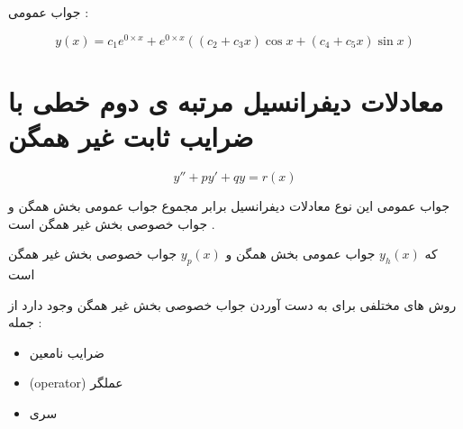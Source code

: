 \documentclass[12pt]{book}
\begin{document}
جواب عمومی :

$$
y(x) = c_{1}e^{0 \times x} + e^{0 \times x} ( (c_{2} + c_{3}x) \cos{x} + (c_{4} + c_{5}x) \sin{x} )
$$



\section{معادلات دیفرانسیل مرتبه ی دوم خطی با ضرایب ثابت غیر همگن}


$$
y'' + py' + qy = r(x)
$$

جواب عمومی این نوع معادلات دیفرانسیل برابر مجموع جواب عمومی بخش همگن و جواب خصوصی بخش غیر همگن است .

\begin{tcolorbox}
\begin{center}
\end{center}
\end{tcolorbox}


\begin{tcolorbox}
\begin{center}
\end{center}
\end{tcolorbox}

که 
$y_{h}(x)$
جواب عمومی بخش همگن و 
$y_{p}(x)$
جواب خصوصی بخش غیر همگن است

روش های مختلفی برای به دست آوردن جواب خصوصی بخش غیر همگن وجود دارد از جمله :
\begin{itemize}
	\item ضرایب نامعین
	\item  (operator) عملگر
	\item سری
\end{itemize}
\end{document}
